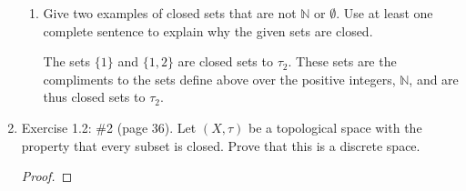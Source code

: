 \documentclass[a4paper, 12pt]{config/homework}
\begin{document}
\begin{enumerate}
\begin{enumerate}[label=\alph*.]
\item Give two examples of closed sets that are not \(\mathbb{N}\) or \(\emptyset\). Use at least one complete sentence to explain why the given sets are closed.

The sets \(\{1\}\) and \(\{1, 2\}\) are closed sets to \(\tau_2\). These sets are the compliments to the sets define above over the positive integers, \(\mathbb{N}\), and are thus closed sets to \(\tau_2\).

\end{enumerate}
\pagebreak
\item Exercise 1.2: \#2 (page 36). Let \((X,\tau)\) be a topological space with the property that every subset is closed. Prove that this is a discrete space.

\begin{proof}

\end{proof}

\end{enumerate}
\end{document}
